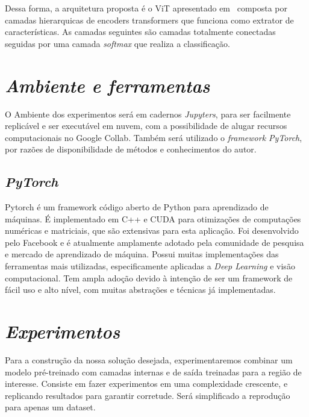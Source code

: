 Dessa forma, a arquitetura proposta é o ViT apresentado em~\cite{wang2022empirical}
composta por camadas hierarquicas de encoders transformers  que funciona como extrator de características. As camadas seguintes são camadas totalmente conectadas seguidas por uma camada \textit{softmax} que realiza a classificação.

\section{\textit{Ambiente e ferramentas}}\label{sec:Cap3_Ferramentas}


O Ambiente dos experimentos será em cadernos \textit{Jupyters}, para ser facilmente replicável e ser executável em nuvem, com a possibilidade de alugar recursos computacionais no Google Collab. Também será utilizado o \textit{framework PyTorch}, por razões de disponibilidade de métodos e conhecimentos do autor.

\subsection{\textit{PyTorch}}\label{sec:Cap2_PyTorch}
Pytorch é um framework código aberto de Python para aprendizado de máquinas. É implementado em C++ e CUDA para otimizações de computações numéricas e matriciais, que são extensivas para esta aplicação.
Foi desenvolvido pelo Facebook e é atualmente amplamente adotado pela comunidade de pesquisa e mercado de aprendizado de máquina. Possui muitas implementações das ferramentas mais utilizadas, especificamente aplicadas a \textit{Deep Learning} e visão computacional. Tem ampla adoção devido à intenção de ser um framework de fácil uso e alto nível, com muitas abstrações e técnicas já implementadas.




\section{\textit{Experimentos}}\label{sec:Cap3_Experimentos}

Para a construção da nossa solução desejada, experimentaremos combinar um modelo pré-treinado com camadas internas e de saída treinadas para a região de interesse.
Consiste em fazer experimentos em uma complexidade crescente, e replicando resultados para garantir corretude. Será simplificado a reprodução para apenas um dataset.



